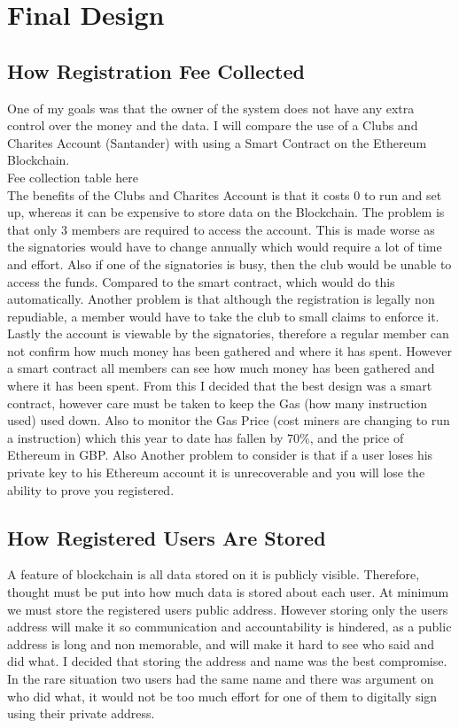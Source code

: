 \chapter{Final Design} \label{Chapter: Final Design}
\section{How Registration Fee Collected}
One of my goals was that the owner of the system does not have any extra control over the money and the data. I will compare the use of a Clubs and Charites Account (Santander) with using a Smart Contract on the Ethereum Blockchain. 
\\
Fee collection table here
\\
The benefits of the Clubs and Charites Account is that it costs 0 to run and set up, whereas it can be expensive to store data on the Blockchain. The problem is that only 3 members are required to access the account. This is made worse as the signatories would have to change annually which would require a lot of time and effort. Also if one of the signatories is busy, then the club would be unable to access the funds. Compared to the smart contract, which would do this automatically.  Another problem is that although the registration is legally non repudiable, a member would have to take the club to small claims to enforce it. Lastly the account is viewable by the signatories, therefore a regular member can not confirm how much money has been gathered and where it has spent. However a smart contract all members can see how much money has been gathered and where it has been spent.
From this I decided that the best design was a smart contract, however care must be taken to keep the Gas (how many instruction used) used down. Also to monitor the Gas Price (cost miners are changing to run a instruction) which this year to date has fallen by 70\%, and the price of Ethereum in GBP. Also Another problem to consider is that if a user loses his private key to his Ethereum account it is unrecoverable and you will lose the ability to prove you registered.
\section{How Registered Users Are Stored}
A feature of blockchain is all data stored on it is publicly visible. Therefore, thought must be put into how much data is stored about each user. At minimum we must store the registered users public address. However storing only the users address will make it so communication and accountability is hindered, as a public address is long and non memorable, and will make it hard to see who said and did what. I decided that storing the address and name was the best compromise. In the rare situation two users had the same name and there was argument on who did what, it would not be too much effort for one of them to digitally sign using their private address.
